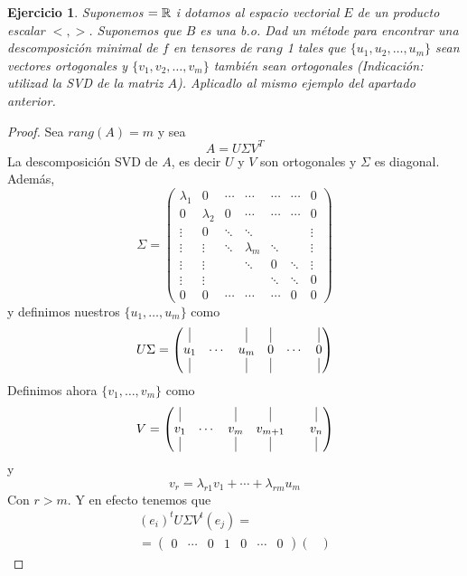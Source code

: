 \documentclass[12pt]{article}
\newcommand{\real}{\mathbb{R}}
\let\k\relax
\newcommand{\k}{\mathbf{k}}
\theoremstyle{break}
\newtheorem{ej}{Ejercicio}
\newtheorem*{proof}{Demostración}
\begin{document}
\begin{ej}
	 Suponemos $\k = \real$ i dotamos al espacio vectorial $E$ de un producto escalar $<,>$.
	 Suponemos que $B$ es una b.o. Dad un métode para encontrar una descomposición minimal
	 de $f$ en tensores de $rang$ 1 tales que $\{u_1,u_2,\dots,u_m\}$ sean vectores
	 ortogonales y $\{v_1,v_2,\dots,v_m\}$ también sean ortogonales (Indicación: utilizad la
	 SVD de la matriz $A$). Aplicadlo al mismo ejemplo del apartado anterior.
\end{ej}
\begin{proof}
	Sea $rang(A) = m$ y sea
	\[
		A = U\Sigma V^T
	\]
	La descomposición SVD de $A$, es decir $U$ y $V$ son ortogonales y $\Sigma$ es diagonal.
	Además,
	\[
		\Sigma = \begin{pmatrix}
			\lambda_1 & 0 & \cdots & \cdots & \cdots  & \cdots & 0 \\
			0 & \lambda_2 & 0 & \cdots & \cdots & \cdots & 0 \\
			\vdots & 0 & \ddots & \ddots & & & \vdots \\
			\vdots & \vdots & \ddots & \lambda_m & \ddots & & \vdots \\
			\vdots & \vdots &  & \ddots & 0 & \ddots & \vdots \\
			\vdots & \vdots & & & \ddots & \ddots & 0 \\
			0 & 0 & \cdots & \cdots & \cdots & 0 & 0
		\end{pmatrix}
	\]
	y definimos nuestros $\{u_1,\dots,u_m\}$ como
	\[
		U\Sigma = \begin{pmatrix}
			\vline & & \vline & \vline & & \vline \\
			u_1 & \cdots & u_m & 0 & \cdots & 0 \\
			\vline & & \vline & \vline & & \vline
		\end{pmatrix}
	\]
	Definimos ahora $\{v_1,\dots,v_m\}$ como
	\[
		V = \begin{pmatrix}
			\vline & & \vline & \vline & & \vline \\
			v_1 & \cdots & v_m & v_{m+1} & & v_n \\
			\vline & & \vline & \vline & & \vline
 		\end{pmatrix}
	\]
	y
	\[
		v_r = \lambda_{r1}v_1 + \cdots + \lambda_{rm} u_m
	\]
	Con $r > m$. Y en efecto tenemos que
	\begin{gather*}
		(e_i)^t U\Sigma V^t (e_j) = \\
		=\begin{pmatrix}
			0 & \cdots & 0 & 1 & 0 & \cdots & 0
		\end{pmatrix} \begin{pmatrix}

\end{pmatrix}
\end{gather*}
\end{proof}
\end{document}
